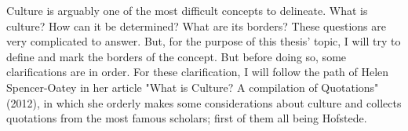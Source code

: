 \documentclass[../main.tex]{subfiles}
\begin{document}



Culture is arguably one of the most difficult concepts to delineate. What is culture? How can it be determined? What are its borders? These questions are very complicated to answer. But, for the purpose of this thesis' topic, I will try to define and mark the borders of the concept. But before doing so, some clarifications are in order. For these clarification, I will follow the path of Helen Spencer-Oatey in her article "What is Culture? A compilation of Quotations"(2012)\cite{helen}, in which she orderly makes some considerations about culture and collects quotations from the most famous scholars; first of them all being Hofstede.
\end{document}
